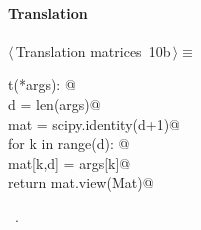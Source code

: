 \documentclass[11pt,oneside]{article}	%
\begin{document}
\paragraph{Translation}
\begin{flushleft} \small \label{scrap19}
\protect{}$\langle\,$Translation matrices\nobreak\ {\footnotesize 10b}$\,\rangle\equiv$
\vspace{-1ex}
\begin{list}{}{} \item
\mbox{}\verb@def t(*args): @\\
\mbox{}\verb@   d = len(args)@\\
\mbox{}\verb@   mat = scipy.identity(d+1)@\\
\mbox{}\verb@   for k in range(d): @\\
\mbox{}\verb@      mat[k,d] = args[k]@\\
\mbox{}\verb@   return mat.view(Mat)@\\
\mbox{}\verb@@{\NWsep}
\end{list}
\vspace{-1ex}
\footnotesize\addtolength{\baselineskip}{-1ex}
\begin{list}{}{\setlength{\itemsep}{-\parsep}\setlength{\itemindent}{-\leftmargin}}
\item \NWtxtMacroRefIn\ .
\end{list}
\end{flushleft}
\end{document}
